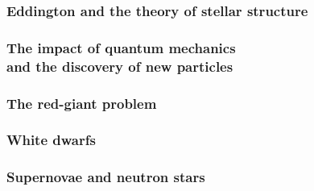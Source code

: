 \subsubsection{Eddington and the theory of stellar structure}

\subsubsection{The impact of quantum mechanics\\ and the discovery of new particles}

\subsubsection{The red-giant problem}

\subsubsection{White dwarfs}

\subsubsection{Supernovae and neutron stars}

